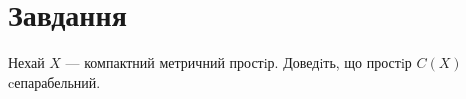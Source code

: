 \chapter{Завдання \theHchapter}

\begin{tcolorbox}[title=Завдання]
    Нехай $X$ — компактний метричний простiр. 
    Доведiть, що простiр $C(X)$ cепарабельний.
\end{tcolorbox}



